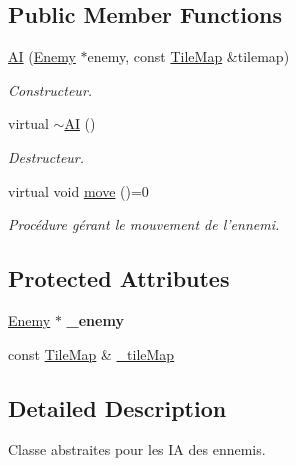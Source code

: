 \subsection*{Public Member Functions}
\begin{DoxyCompactItemize}
\item 
\hyperlink{class_a_i_ac6a30583e7e676d85434d7e88eeec041}{A\+I} (\hyperlink{class_enemy}{Enemy} $\ast$enemy, const \hyperlink{class_tile_map}{Tile\+Map} \&tilemap)
\begin{DoxyCompactList}\small\item\em Constructeur. \end{DoxyCompactList}\item 
virtual \hyperlink{class_a_i_ac86c87957e3d563f6ea2137a97992e0a}{$\sim$\+A\+I} ()
\begin{DoxyCompactList}\small\item\em Destructeur. \end{DoxyCompactList}\item 
virtual void \hyperlink{class_a_i_a029ec0ca07e6644af6662cf08300ed0c}{move} ()=0
\begin{DoxyCompactList}\small\item\em Procédure gérant le mouvement de l'ennemi. \end{DoxyCompactList}\end{DoxyCompactItemize}
\subsection*{Protected Attributes}
\begin{DoxyCompactItemize}
\item 
\hypertarget{class_a_i_af918afabc099ef611231be287eb4d6df}{\hyperlink{class_enemy}{Enemy} $\ast$ {\bfseries \+\_\+enemy}}\label{class_a_i_af918afabc099ef611231be287eb4d6df}

\item 
const \hyperlink{class_tile_map}{Tile\+Map} \& \hyperlink{class_a_i_a5b798605999a06067b97a45c6e7f2dc2}{\+\_\+tile\+Map}
\end{DoxyCompactItemize}


\subsection{Detailed Description}
Classe abstraites pour les I\+A des ennemis. 

